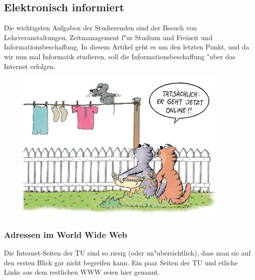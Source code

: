 \subsection{Elektronisch informiert}

Die wichtigsten Aufgaben der Studierenden sind der Besuch von
Lehrveranstaltungen, Zeitmanagement f"ur Studium und Freizeit und
Informationsbeschaffung. In diesem Artikel geht es um den letzten Punkt, und da
wir nun mal Informatik studieren, soll die Informationsbeschaffung "uber das
Internet erfolgen.

\begin{figure}[h]
  \centering\includegraphics[width = \linewidth]{bilder/stein1.png}
\end{figure}

\subsubsection*{Adressen im World Wide Web}

Die Internet-Seiten der TU sind so riesig (oder un"ubersichtlich), dass man sie
auf den ersten Blick gar nicht begreifen kann. Ein paar Seiten der TU und
etliche Links aus dem restlichen WWW seien hier genannt.

